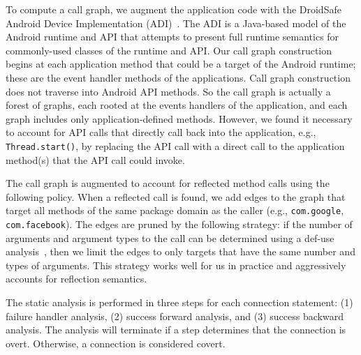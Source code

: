 To compute a call graph, we augment the application code with the
DroidSafe Android Device Implementation
(ADI)~\cite{Gordon:Kim:Perkins:Gilham:Nguyen:Rinard:NDSS15}.  The ADI
is a Java-based model of the Android runtime and API that attempts to
present full runtime semantics for commonly-used classes of the
runtime and API.  Our call graph construction begins at each
application method that could be a target of the Android runtime;
these are the event handler methods of the applications.  Call graph
construction does not traverse into Android API methods.  So the call
graph is actually a forest of graphs, each rooted at the events
handlers of the application, and each graph includes only
application-defined methods.  However, we found it necessary to
account for API calls that directly call back into the application,
e.g., \lstinline!Thread.start()!, by replacing the API call with a
direct call to the application method(s) that the API call could
invoke.



The call graph is augmented to account for reflected
method calls using the following policy.  When a
reflected call is found, we add edges to the graph that target all
methods of the same package domain as the caller (e.g.,
\lstinline!com.google!, \lstinline!com.facebook!).  The edges are pruned by the
following strategy: if the number of arguments and argument types to
the call can be determined using a def-use analysis~\cite{Aho2006},
then we limit the edges to only targets that have the same number and
types of arguments.  This strategy works well for us in
practice and aggressively accounts for reflection semantics.

The static analysis is performed in three steps for each connection
statement: (1) failure handler analysis, (2) success forward analysis,
and (3) success backward analysis.  The analysis will terminate if a
step determines that the connection is overt. Otherwise, a
connection is considered covert.

